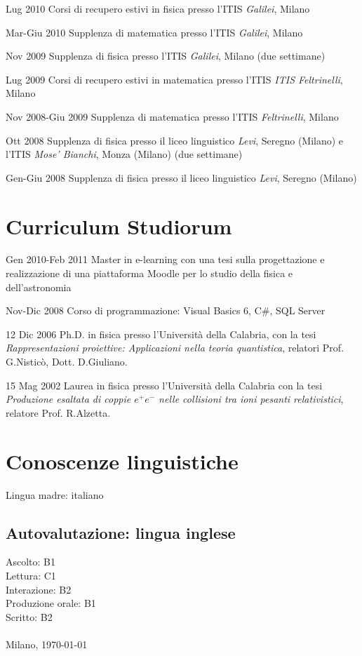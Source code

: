 \begin{CV}
	\item[Lug 2010] Corsi di recupero estivi in fisica presso l'ITIS {\em Galilei}, Milano
	
	\item[Mar-Giu 2010] Supplenza di matematica presso l'ITIS {\em Galilei}, Milano
	
	\item[Nov 2009] Supplenza di fisica presso l'ITIS {\em Galilei}, Milano (due settimane)
	
	\item[Lug 2009] Corsi di recupero estivi in matematica presso l'ITIS {\em ITIS Feltrinelli}, Milano
	
	\item[Nov 2008-Giu 2009] Supplenza di matematica presso l'ITIS {\em Feltrinelli}, Milano
	
	\item[Ott 2008] Supplenza di fisica presso il liceo linguistico {\em Levi}, Seregno (Milano) e l'ITIS {\em Mose' Bianchi}, Monza (Milano) (due settimane)
	
	\item[Gen-Giu 2008] Supplenza di fisica presso il liceo linguistico {\em Levi}, Seregno (Milano)
	
\end{CV}

\section{Curriculum Studiorum}

\begin{CV}
	\item[Gen 2010-Feb 2011] Master in e-learning con una tesi sulla progettazione e realizzazione di una piattaforma Moodle per lo studio della fisica e dell'astronomia
	
	\item[Nov-Dic 2008] Corso di programmazione: Visual Basics 6, C\#, SQL Server
	
	\item[12 Dic 2006] Ph.D. in fisica presso l'Universit\`a della Calabria, con la tesi {\em Rappresentazioni proiettive: Applicazioni nella teoria quantistica}, relatori Prof. G.Nistic\`o, Dott. D.Giuliano.
	
	\item[15 Mag 2002] Laurea in fisica presso l'Universit\`a della Calabria con la tesi {\em Produzione esaltata di coppie $e^+ e^-$ nelle collisioni tra ioni pesanti relativistici}, relatore Prof. R.Alzetta.
\end{CV}
%
\section{Conoscenze linguistiche}
Lingua madre: italiano
\subsection*{Autovalutazione: lingua inglese}
Ascolto: B1\\
Lettura: C1\\
Interazione: B2\\
Produzione orale: B1\\
Scritto: B2\\\\
%
\vspace{2\baselineskip}
\noindent Milano, \today